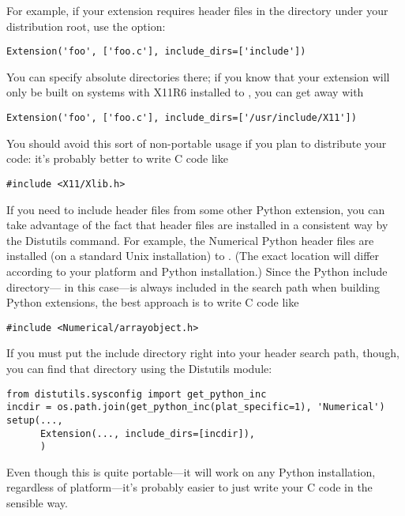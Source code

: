 \documentclass{manual}
\begin{document}
For example, if your extension requires header files in the
 directory under your distribution root, use the
 option:

\begin{verbatim}
Extension('foo', ['foo.c'], include_dirs=['include'])
\end{verbatim}

You can specify absolute directories there; if you know that your
extension will only be built on \UNIX{} systems with X11R6 installed to
, you can get away with

\begin{verbatim}
Extension('foo', ['foo.c'], include_dirs=['/usr/include/X11'])
\end{verbatim}

You should avoid this sort of non-portable usage if you plan to
distribute your code: it's probably better to write C code like
\begin{verbatim}
#include <X11/Xlib.h>
\end{verbatim}

If you need to include header files from some other Python extension,
you can take advantage of the fact that header files are installed in a
consistent way by the Distutils  command.  For
example, the Numerical Python header files are installed (on a standard
Unix installation) to .
(The exact location will differ according to your platform and Python
installation.)  Since the Python include
directory--- in this case---is always
included in the search path when building Python extensions, the best
approach is to write C code like
\begin{verbatim}
#include <Numerical/arrayobject.h>
\end{verbatim}
If you must put the  include directory right into your
header search path, though, you can find that directory using the
Distutils  module:

\begin{verbatim}
from distutils.sysconfig import get_python_inc
incdir = os.path.join(get_python_inc(plat_specific=1), 'Numerical')
setup(...,
      Extension(..., include_dirs=[incdir]),
      )
\end{verbatim}

Even though this is quite portable---it will work on any Python
installation, regardless of platform---it's probably easier to just
write your C code in the sensible way.
\end{document}
